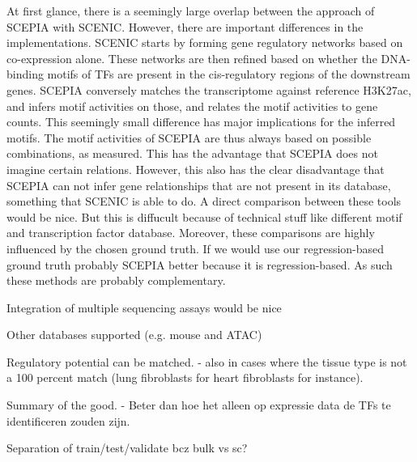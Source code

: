 At first glance, there is a seemingly large overlap between the approach of SCEPIA with SCENIC\cite{Aibar_2017}. However, there are important differences in the implementations. SCENIC starts by forming gene regulatory networks based on co-expression alone. These networks are then refined based on whether the DNA-binding motifs of TFs are present in the cis-regulatory regions of the downstream genes. SCEPIA conversely matches the transcriptome against reference H3K27ac, and infers motif activities on those, and relates the motif activities to gene counts. This seemingly small difference has major implications for the inferred motifs. The motif activities of SCEPIA are thus always based on possible combinations, as measured. This has the advantage that SCEPIA does not imagine certain relations. However, this also has the clear disadvantage that SCEPIA can not infer gene relationships that are not present in its database, something that SCENIC is able to do. A direct comparison between these tools would be nice. But this is diffucult because of technical stuff like different motif and transcription factor database. Moreover, these comparisons are highly influenced by the chosen ground truth. If we would use our regression-based ground truth probably SCEPIA better because it is regression-based. As such these methods are probably complementary.

Integration of multiple sequencing assays would be nice

Other databases supported (e.g. mouse and ATAC)

Regulatory potential can be matched.
- also in cases where the tissue type is not a 100 percent match (lung fibroblasts for heart fibroblasts for instance).

Summary of the good.
- Beter dan hoe het alleen op expressie data de TFs te identificeren zouden zijn.

Separation of train/test/validate bcz bulk vs sc?

